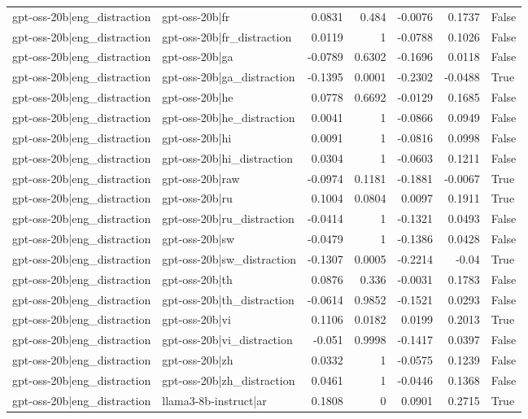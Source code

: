 \begin{table}
\begin{tabular}{l l r r r r l}
gpt-oss-20b|eng_distraction & gpt-oss-20b|fr & 0.0831 & 0.484 & -0.0076 & 0.1737 & False \\
gpt-oss-20b|eng_distraction & gpt-oss-20b|fr_distraction & 0.0119 & 1 & -0.0788 & 0.1026 & False \\
gpt-oss-20b|eng_distraction & gpt-oss-20b|ga & -0.0789 & 0.6302 & -0.1696 & 0.0118 & False \\
gpt-oss-20b|eng_distraction & gpt-oss-20b|ga_distraction & -0.1395 & 0.0001 & -0.2302 & -0.0488 & True \\
gpt-oss-20b|eng_distraction & gpt-oss-20b|he & 0.0778 & 0.6692 & -0.0129 & 0.1685 & False \\
gpt-oss-20b|eng_distraction & gpt-oss-20b|he_distraction & 0.0041 & 1 & -0.0866 & 0.0949 & False \\
gpt-oss-20b|eng_distraction & gpt-oss-20b|hi & 0.0091 & 1 & -0.0816 & 0.0998 & False \\
gpt-oss-20b|eng_distraction & gpt-oss-20b|hi_distraction & 0.0304 & 1 & -0.0603 & 0.1211 & False \\
gpt-oss-20b|eng_distraction & gpt-oss-20b|raw & -0.0974 & 0.1181 & -0.1881 & -0.0067 & True \\
gpt-oss-20b|eng_distraction & gpt-oss-20b|ru & 0.1004 & 0.0804 & 0.0097 & 0.1911 & True \\
gpt-oss-20b|eng_distraction & gpt-oss-20b|ru_distraction & -0.0414 & 1 & -0.1321 & 0.0493 & False \\
gpt-oss-20b|eng_distraction & gpt-oss-20b|sw & -0.0479 & 1 & -0.1386 & 0.0428 & False \\
gpt-oss-20b|eng_distraction & gpt-oss-20b|sw_distraction & -0.1307 & 0.0005 & -0.2214 & -0.04 & True \\
gpt-oss-20b|eng_distraction & gpt-oss-20b|th & 0.0876 & 0.336 & -0.0031 & 0.1783 & False \\
gpt-oss-20b|eng_distraction & gpt-oss-20b|th_distraction & -0.0614 & 0.9852 & -0.1521 & 0.0293 & False \\
gpt-oss-20b|eng_distraction & gpt-oss-20b|vi & 0.1106 & 0.0182 & 0.0199 & 0.2013 & True \\
gpt-oss-20b|eng_distraction & gpt-oss-20b|vi_distraction & -0.051 & 0.9998 & -0.1417 & 0.0397 & False \\
gpt-oss-20b|eng_distraction & gpt-oss-20b|zh & 0.0332 & 1 & -0.0575 & 0.1239 & False \\
gpt-oss-20b|eng_distraction & gpt-oss-20b|zh_distraction & 0.0461 & 1 & -0.0446 & 0.1368 & False \\
gpt-oss-20b|eng_distraction & llama3-8b-instruct|ar & 0.1808 & 0 & 0.0901 & 0.2715 & True \\

\end{tabular}
\end{table}
